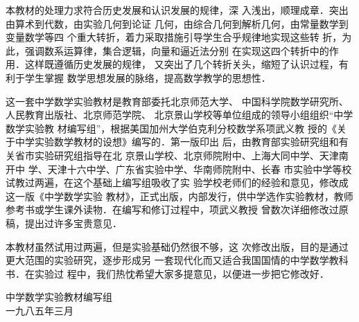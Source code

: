     本教材的处理力求符合历史发展和认识发展的规律，深
入浅出，顺理成章．突出由算术到代数，由实验几何到论证
几何，由综合几何到解析几何，由常量数学到变量数学等四
个重大转折，着力采取措施引导学生合乎规律地实现这些转
折，为此，强调数系运算律，集合逻辑，向量和逼近法分别
在实现这四个转折中的作用．这样既遵循历史发展的规律，
又突出了几个转折关头，缩短了认识过程，有利于学生掌握
数学思想发展的脉络，提高数学教学的思想性．

这一套中学数学实验教材是教育部委托北京师范大学、
中国科学院数学研究所、人民教育出版社、北京师范学院、
北京景山学校等单位组成的领导小组组织“中学数学实验教
材编写组”，根据美国加州大学伯克利分校数学系项武义教
授的《关于中学实验数学教材的设想》编写的．第一版印出
后，由教育部实验研究组和有关省市实验研究组指导在北
京景山学校、北京师院附中、上海大同中学、天津南开中
学、天津十六中学、广东省实验中学、华南师院附中、长春
市实验中学等校试教过两遍，在这个基础上编写组吸收了实
验学校老师们的经验和意见，修改成这一版《中学数学实验
教材》，正式出版，内部发行，供中学选作实验教材，教师
参考书或学生课外读物．在编写和修订过程中，项武义教授
曾数次详细修改过原稿，提出过许多宝贵意见．

    本教材虽然试用过两遍，但是实验基础仍然很不够，这
次修改出版，目的是通过更大范围的实验研究，逐步形成另
一套现代化而又适合我国国情的中学数学教科书．在实验过
程中，我们热忱希望大家多提意见，以便进一步把它修改好．

\begin{flushright}
    中学数学实验教材编写组\\
    一九八五年三月
\end{flushright}







